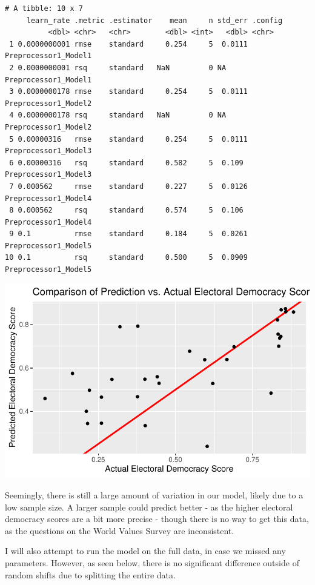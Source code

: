 \documentclass[
  letterpaper,
  DIV=11,
  numbers=noendperiod]{scrartcl}
\begin{document}
\begin{verbatim}
# A tibble: 10 x 7
     learn_rate .metric .estimator    mean     n std_err .config             
          <dbl> <chr>   <chr>        <dbl> <int>   <dbl> <chr>               
 1 0.0000000001 rmse    standard     0.254     5  0.0111 Preprocessor1_Model1
 2 0.0000000001 rsq     standard   NaN         0 NA      Preprocessor1_Model1
 3 0.0000000178 rmse    standard     0.254     5  0.0111 Preprocessor1_Model2
 4 0.0000000178 rsq     standard   NaN         0 NA      Preprocessor1_Model2
 5 0.00000316   rmse    standard     0.254     5  0.0111 Preprocessor1_Model3
 6 0.00000316   rsq     standard     0.582     5  0.109  Preprocessor1_Model3
 7 0.000562     rmse    standard     0.227     5  0.0126 Preprocessor1_Model4
 8 0.000562     rsq     standard     0.574     5  0.106  Preprocessor1_Model4
 9 0.1          rmse    standard     0.184     5  0.0261 Preprocessor1_Model5
10 0.1          rsq     standard     0.500     5  0.0909 Preprocessor1_Model5
\end{verbatim}

\includegraphics{Episode_2_files/figure-pdf/finalfit-1.pdf}

Seemingly, there is still a large amount of variation in our model,
likely due to a low sample size. A larger sample could predict better -
as the higher electoral democracy scores are a bit more precise - though
there is no way to get this data, as the questions on the World Values
Survey are inconsistent.

I will also attempt to run the model on the full data, in case we missed
any parameters. However, as seen below, there is no significant
difference outside of random shifts due to splitting the entire data.
\end{document}
